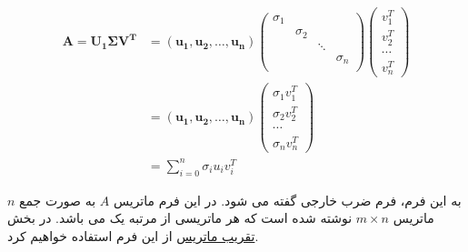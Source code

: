 	\begin{align*}
		\mathbf{A = U_1\Sigma V^T } &= \mathbf{\left( u_1, u_2, \ldots, u_n\right)}
		\begin{pmatrix}
			\sigma_{1} & & &\\
		    & \sigma_{2} & &\\
		    & & \ddots & \\ 
		    & & & \sigma_{n} \\
		\end{pmatrix}
		\begin{pmatrix}
		v_1^T \\
		v_2^T \\
		\cdots\\
		v_n^T
		\end{pmatrix}\\
		 &= \mathbf{ \left( u_1, u_2, \ldots, u_n\right)}
		\begin{pmatrix}
		 \sigma_{1}v_1^T \\
		 \sigma_{2}v_2^T \\
		 \cdots\\
		 \sigma_{n}v_n^T
		\end{pmatrix}\\
		&= \sum_{i=0}^{n} \sigma_{i}u_iv_i^T
	\end{align*}
  	 
  		به این فرم، فرم ضرب خارجی گفته  می شود. در این فرم ماتریس $ A $ به صورت جمع $ n $ ماتریس $ m \times n $ نوشته شده است که هر ماتریسی از مرتبه یک می باشد. در بخش 	\hyperref[sec:mat_approx]{تقریب ماتریس} از این فرم استفاده خواهیم کرد. 
  	
  	
 	
	\pagebreak
